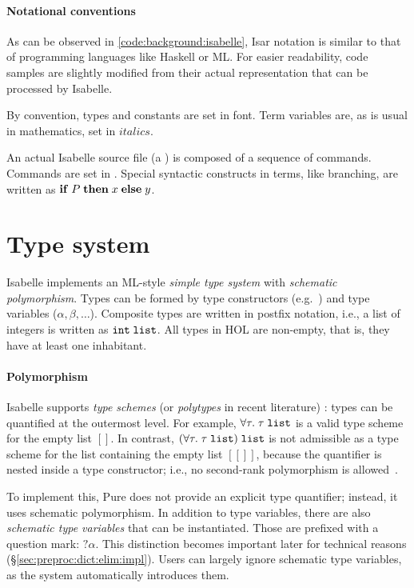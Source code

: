 \paragraph{Notational conventions}
As can be observed in \cref{code:background:isabelle}, Isar notation is similar to that of programming languages like Haskell or ML.
For easier readability, code samples are slightly modified from their actual representation that can be processed by Isabelle.

By convention, types and constants are set in  font.
Term variables are, as is usual in mathematics, set in $\mathit{italics}$.

An actual Isabelle source file (a ) is composed of a sequence of commands.
Commands are set in .
Special syntactic constructs in terms, like branching, are written as $\mathtt{\mathbf{if}}\;P\;\mathtt{\mathbf{then}}\;x\;\mathtt{\mathbf{else}}\;y$.

\section{Type system}
\label{sec:background:types}

Isabelle implements an ML-style \emph{simple type system} with \emph{schematic polymorphism}.
Types can be formed by type constructors (e.g.\ ) and type variables ($\alpha, \beta, \ldots$).
Composite types are written in postfix notation, i.e., a list of integers is written as $\texttt{\textup{int}}\;\texttt{\textup{list}}$.
All types in HOL are non-empty, that is, they have at least one inhabitant.

\paragraph{Polymorphism}
Isabelle supports \emph{type schemes} (or \emph{polytypes} in recent literature) \cite{milner1978polymorphism,hindley1969principal}:
types can be quantified at the outermost level.
For example, $\forall \tau.\; \tau\;\texttt{\textup{list}}$ is a valid type scheme for the empty list $[]$.
In contrast, $(\forall \tau.\; \tau\;\texttt{\textup{list}})\;\texttt{\textup{list}}$ is not admissible as a type scheme for the list containing the empty list $[[]]$, because the quantifier is nested inside a type constructor; i.e., no second-rank polymorphism is allowed~\cite{botlan2003mlf}.

To implement this, Pure does not provide an explicit type quantifier; instead, it uses schematic polymorphism.
In addition to type variables, there are also \emph{schematic type variables} that can be instantiated.
Those are prefixed with a question mark: $?\alpha$.
This distinction becomes important later for technical reasons (§\ref{sec:preproc:dict:elim:impl}).
Users can largely ignore schematic type variables, as the system automatically introduces them.

